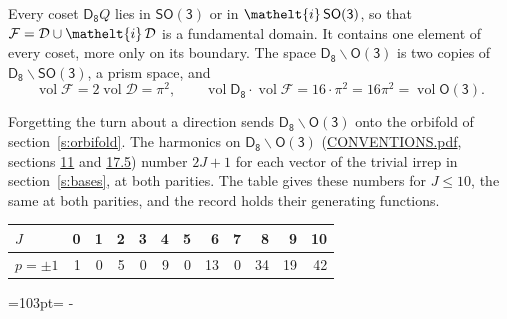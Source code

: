 \documentclass[10pt,a4paper]{article}
\newcommand{\needspace}[1]{\par\penalty-100\begingroup\dimen0=#1\relax\dimen2=\pagegoal
  \advance\dimen2-\pagetotal\ifdim\dimen0>\dimen2\relax\ifdim\dimen2>0pt\vfil\break\fi\fi
  \endgroup}
\numberwithin{equation}{section}
\newcommand{\eltfont}[1]{{\let\sigma\eltsigma\mathelt{#1}}}
\newcommand{\grp}[1]{\mathsf{#1}}
\newcommand{\elt}[1]{\eltfont{#1}}
\newcommand{\vol}{\operatorname{vol}}
\newcommand{\fcell}{\mathcal{D}}
\newcommand{\fdomain}{\mathcal{F}}
\begin{document}
\leavevmode\label{n:set.fundamental}Every coset $\grp{D_{8}}Q$ lies in \href{SO3.pdf}{$\grp{SO(3)}$} or in $\elt{i}\,\grp{SO(3)}$, so that $\fdomain = \fcell \cup \elt{i}\,\fcell$ is a fundamental domain. It contains one element of every coset, more only on its boundary.
The space $\grp{D_{8}}\backslash\grp{O(3)}$ is two copies of $\grp{D_{8}}\backslash\grp{SO(3)}$, a prism space, and
\begin{equation}\label{e:volume}\vol\fdomain = 2\vol\fcell = \pi^2,\qquad \vol\grp{D_{8}}\cdot\vol\fdomain = 16\cdot \pi^2 = 16\pi^2 = \vol\grp{O(3)}.\end{equation}

Forgetting the turn about a direction sends $\grp{D_{8}}\backslash\grp{O(3)}$ onto the orbifold of section~\ref{s:orbifold}.
The harmonics on $\grp{D_{8}}\backslash\grp{O(3)}$ (\href{../../CONVENTIONS.pdf}{CONVENTIONS.pdf}, sections \href{../../CONVENTIONS.pdf\#conv.11}{11} and \href{../../CONVENTIONS.pdf\#conv.17.5}{17.5}) number $2J + 1$ for each vector of the trivial irrep in section~\ref{s:bases}, at both parities. The table gives these numbers for $J \le 10$, the same at both parities, and the record holds their generating functions.
{\small\setlength{\tabcolsep}{4pt}\begin{longtable}{@{}lrrrrrrrrrrr@{}}\toprule
$J$ & 0 & 1 & 2 & 3 & 4 & 5 & 6 & 7 & 8 & 9 & 10\\\midrule\endhead
\bottomrule\endfoot\endlastfoot
$p = \pm 1$ & 1 & 0 & 5 & 0 & 9 & 0 & 13 & 0 & 34 & 19 & 42\\
\bottomrule\end{longtable}}
\needspace{103pt}
\end{document}
